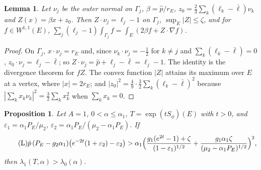 \documentclass[11pt]{article}
\newtheorem{proposition}[theorem]{Proposition}
\newtheorem{lemma}[theorem]{Lemma}
\theoremstyle{remark}
\begin{document}
\begin{lemma}\label{p-lem:Z}
Let $\nu_j$ be the outer normal on $\Gamma_j$, $\beta=\hat p/r_E$,
$z_0=\frac23\sum_k(\ell_k-\bar\ell)\nu_k$ and $Z(x)=\beta x+z_0$. Then $Z\cdot\nu_j=\ell_j-1$ on
$\Gamma_j$, $\sup_E|Z|\le\zeta$, and for $f\in W^{1,1}(E)$,
$\sum_j(\ell_j-1)\int_{\Gamma_j}f=\int_E(2\beta f+Z\cdot\nabla f)$.
\end{lemma}

\begin{proof}
On $\Gamma_j$, $x\cdot\nu_j=r_E$ and, since $\nu_k\cdot\nu_j=-\frac12$ for $k\ne j$ and
$\sum_k(\ell_k-\bar\ell)=0$, $z_0\cdot\nu_j=\ell_j-\bar\ell$; so
$Z\cdot\nu_j=\hat p+\ell_j-\bar\ell=\ell_j-1$. The identity is the divergence theorem for $fZ$.
The convex function $|Z|$ attains its maximum over $E$ at a vertex, where $|x|=2r_E$; and
$|z_0|^2=\frac49\cdot\frac32\sum_k(\ell_k-\bar\ell)^2$ because
$|\sum_kx_k\nu_k|^2=\frac32\sum_kx_k^2$ when $\sum_kx_k=0$.
\end{proof}

\begin{proposition}\label{p-prop:L}
Let $A=1$, $0<\alpha\le\alpha_1$, $T=\exp(tS_\phi)(E)$ with $t>0$, and
$\varepsilon_1=\alpha_1P_E/\mu_2$, $\varepsilon_2=\alpha_1P_E/(\mu_2-\alpha_1P_E)$. If
\begin{equation}\label{p-eq:L}\tag{L}
  \hat p\,(P_E-g_2\alpha_1)\bigl(e^{-2t}(1+\varepsilon_2)-\varepsilon_2\bigr)
  >\alpha_1\Bigl(\frac{g_1(e^{2t}-1)+\zeta}{(1-\varepsilon_1)^{1/2}}
  +\frac{g_1\alpha_1\zeta}{(\mu_2-\alpha_1P_E)^{1/2}}\Bigr)^2,
\end{equation}
then $\lambda_1(T,\alpha)>\lambda_0(\alpha)$.
\end{proposition}
\end{document}
